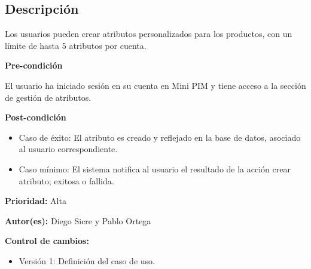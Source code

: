 

\subsection*{Descripción}
Los usuarios pueden crear atributos personalizados para los productos, con un límite de hasta 5 atributos por cuenta.
\vspace{0.15cm}

\textbf{Pre-condición}\par
El usuario ha iniciado sesión en su cuenta en Mini PIM y tiene acceso a la sección de gestión de atributos.\par
\vspace{0.15cm}

\textbf{Post-condición}
\begin{itemize}
    \item Caso de éxito: El atributo es creado y reflejado en la base de datos, asociado al usuario correspondiente.
    \item Caso mínimo: El sistema notifica al usuario el resultado de la acción crear atributo; exitosa o fallida.
\end{itemize}

\textbf{Prioridad: }
Alta
\vspace{0.15cm}

\textbf{Autor(es): }
Diego Sicre y Pablo Ortega\par
\vspace{0.15cm}

\textbf{Control de cambios: }
\begin{itemize}
    \item Versión 1: Definición del caso de uso.
\end{itemize}

